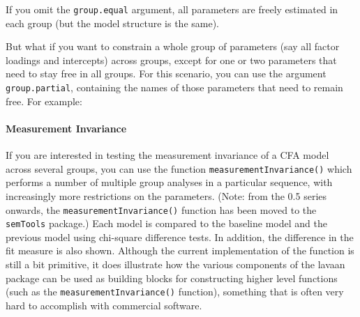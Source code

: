 If you omit the \texttt{group.equal} argument, all parameters are freely
estimated in each group (but the model structure is the same).

But what if you want to constrain a whole group of parameters (say all
factor loadings and intercepts) across groups, except for one or two
parameters that need to stay free in all groups. For this scenario, you
can use the argument \texttt{group.partial}, containing the names of
those parameters that need to remain free. For example:

\begin{Shaded}
\begin{Highlighting}[]
\StringTok{ }
            
            \NormalTok{,}
            \NormalTok{(}\NormalTok{, }\NormalTok{),}
            \NormalTok{(}\NormalTok{, }\NormalTok{))}
\end{Highlighting}
\end{Shaded}

\paragraph{Measurement Invariance}

If you are interested in testing the measurement invariance of a CFA
model across several groups, you can use the function
\texttt{measurementInvariance()} which performs a number of multiple
group analyses in a particular sequence, with increasingly more
restrictions on the parameters. (Note: from the 0.5 series onwards, the
\texttt{measurementInvariance()} function has been moved to the
\texttt{semTools} package.) Each model is compared to the baseline model
and the previous model using chi-square difference tests. In addition,
the difference in the fit measure is also shown. Although the current
implementation of the function is still a bit primitive, it does
illustrate how the various components of the lavaan package can be used
as building blocks for constructing higher level functions (such as the
\texttt{measurementInvariance()} function), something that is often very
hard to accomplish with commercial software.

\begin{Shaded}
\begin{Highlighting}[]
  \NormalTok{)}
\end{Highlighting}
\end{Shaded}

